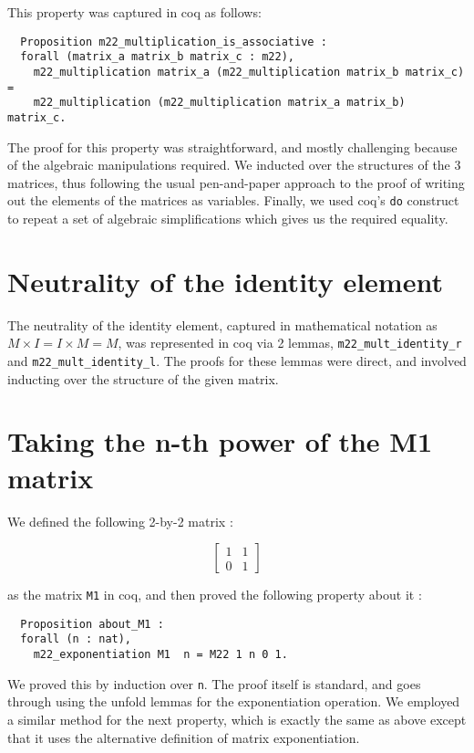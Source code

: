 \documentclass[12pt, a4paper]{article}
\begin{document}
This property was captured in coq as follows: 

\begin{lstlisting}
  Proposition m22_multiplication_is_associative :
  forall (matrix_a matrix_b matrix_c : m22),
    m22_multiplication matrix_a (m22_multiplication matrix_b matrix_c) =
    m22_multiplication (m22_multiplication matrix_a matrix_b) matrix_c.
\end{lstlisting}

The proof for this property was straightforward, and mostly challenging because
of the algebraic manipulations required. We inducted over the structures of the
3 matrices, thus following the usual pen-and-paper approach to the proof of writing
out the elements of the matrices as variables. Finally, we used 
coq's \verb-do- construct to repeat a set of algebraic simplifications which gives
us the required equality.

\section{Neutrality of the identity element}

The neutrality of the identity element, captured in mathematical notation as 
$M \times I = I \times M = M$, was represented in coq via 2 lemmas, 
\verb-m22_mult_identity_r- and \verb-m22_mult_identity_l-. The proofs
for these lemmas were direct, and involved inducting over the structure of the given
matrix.


\section{Taking the n-th power of the M1 matrix}
We defined the following 2-by-2 matrix : 

$$
\begin{bmatrix}
  1 & 1 \\
  0 & 1
\end{bmatrix} 
$$

as the matrix \verb-M1- in coq, and then proved the following property about it :

\begin{lstlisting}
  Proposition about_M1 : 
  forall (n : nat),
    m22_exponentiation M1  n = M22 1 n 0 1.
\end{lstlisting}

We proved this by induction over \verb-n-. The proof itself is standard, and goes 
through using the unfold lemmas for the exponentiation operation. We employed a similar
method for the next property, which is exactly the same as above except that it
uses the alternative definition of matrix exponentiation. 
\end{document}
